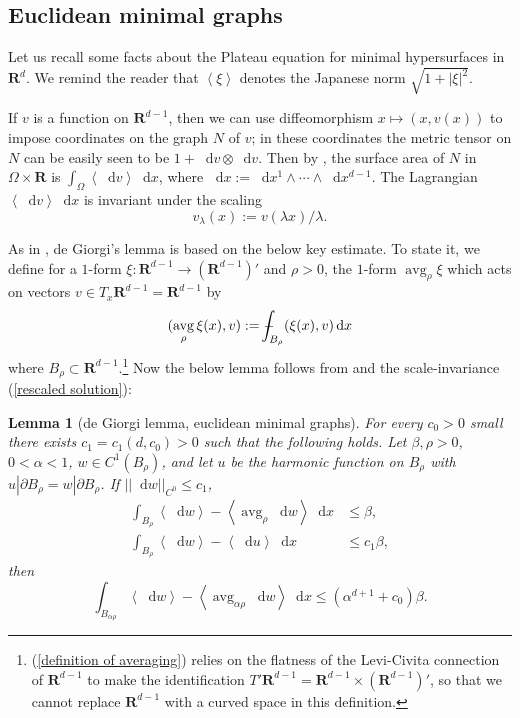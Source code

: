 \documentclass[reqno,10pt]{amsart}
\newcommand{\RR}{\mathbf{R}}
\DeclareMathOperator{\avg}{avg}
\newcommand*\dif{\mathop{}\!\mathrm{d}}
\def\Japan#1{\left \langle #1 \right \rangle}
\newtheorem{lemma}[theorem]{Lemma}
\theoremstyle{definition}
\numberwithin{equation}{section}
\def\Xint#1{\mathchoice
{\XXint\displaystyle\textstyle{#1}}%
{\XXint\textstyle\scriptstyle{#1}}%
{\XXint\scriptstyle\scriptscriptstyle{#1}}%
{\XXint\scriptscriptstyle\scriptscriptstyle{#1}}%
\!\int}
\def\XXint#1#2#3{{\setbox0=\hbox{$#1{#2#3}{\int}$ }
\vcenter{\hbox{$#2#3$ }}\kern-.6\wd0}}
\def\dashint{\Xint-}
\begin{document}

\subsection{Euclidean minimal graphs}
Let us recall some facts about the Plateau equation for minimal hypersurfaces in $\RR^d$.
We remind the reader that $\Japan\xi$ denotes the Japanese norm $\sqrt{1 + |\xi|^2}$.

If $v$ is a function on $\RR^{d - 1}$, then we can use diffeomorphism $x \mapsto (x, v(x))$ to impose coordinates on the graph $N$ of $v$; in these coordinates the metric tensor on $N$ can be easily seen to be $1 + \dif v \otimes \dif v$.
Then by \cite[(24)]{Petersen2008}, the surface area of $N$ in $\Omega \times \RR$ is $\int_\Omega \Japan{\dif v} \dif x$, where $\dif x := \dif x^1 \wedge \cdots \wedge \dif x^{d - 1}$.
The Lagrangian $\Japan{\dif v} \dif x$ is invariant under the scaling
\begin{equation}\label{rescaled solution}
v_\lambda(x) := v(\lambda x)/\lambda.
\end{equation}

As in \cite{deGiorgi61, Miranda66}, de Giorgi's lemma is based on the below key estimate.
To state it, we define for a $1$-form $\xi: \RR^{d - 1} \to (\RR^{d - 1})'$ and $\rho > 0$, the $1$-form $\avg_\rho \xi$ which acts on vectors $v \in T_x\RR^{d - 1} = \RR^{d - 1}$ by
\begin{equation}\label{definition of averaging}
(\avg_\rho \xi(x), v) := \dashint_{B_\rho} (\xi(x), v) \dif x
\end{equation}
where $B_\rho \subset \RR^{d - 1}$.\footnote{(\ref{definition of averaging}) relies on the flatness of the Levi-Civita connection of $\RR^{d - 1}$ to make the identification $T'\RR^{d - 1} = \RR^{d - 1} \times (\RR^{d - 1})'$, so that we cannot replace $\RR^{d - 1}$ with a curved space in this definition.}
Now the below lemma follows from \cite[Lemma 4.2]{Miranda66} and the scale-invariance (\ref{rescaled solution}):

\begin{lemma}[de Giorgi lemma, euclidean minimal graphs]\label{Miranda42 quant}
For every $c_0 > 0$ small there exists $c_1 = c_1(d, c_0) > 0$ such that the following holds.
Let $\beta, \rho > 0$, $0 < \alpha < 1$, $w \in C^1(B_\rho)$, and let $u$ be the harmonic function on $B_\rho$ with $u|\partial B_\rho = w|\partial B_\rho$.
If $||\dif w||_{C^0} \leq c_1$,
\begin{align}
\int_{B_\rho} \Japan{\dif w} - \Japan{\avg_\rho \dif w} \dif x &\leq \beta, \label{Miranda42 hyp} \\
\int_{B_\rho} \Japan{\dif w} - \Japan{\dif u} \dif x &\leq c_1 \beta,
\end{align}
then 
\begin{equation}\label{Miranda42 concl}
\int_{B_{\alpha \rho}} \Japan{\dif w} - \Japan{\avg_{\alpha \rho} \dif w} \dif x \leq (\alpha^{d + 1} + c_0) \beta.
\end{equation}
\end{lemma}
\end{document}
